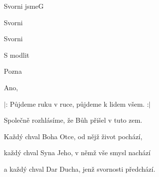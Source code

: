 \setcounter{page}{117}
\begin{song}{Svorni jsme}{G}{}

\begin{SBVerse}

Svorni 

Svorni 

S modlit

\end{SBVerse}

\begin{SBChorus}

Pozna

Ano, 

\end{SBChorus}

\begin{SBVerse}

$|$: Půjdeme ruku v ruce, půjdeme k lidem všem. :$|$

Společně rozhlásíme, že Bůh přišel v tuto zem.

\end{SBVerse}

\begin{SBVerse}

Každý chval Boha Otce, od nějž život pochází,

každý chval Syna Jeho, v němž vše smysl nachází

a každý chval Dar Ducha, jenž svornosti předchází.

\end{SBVerse}

\end{song}
